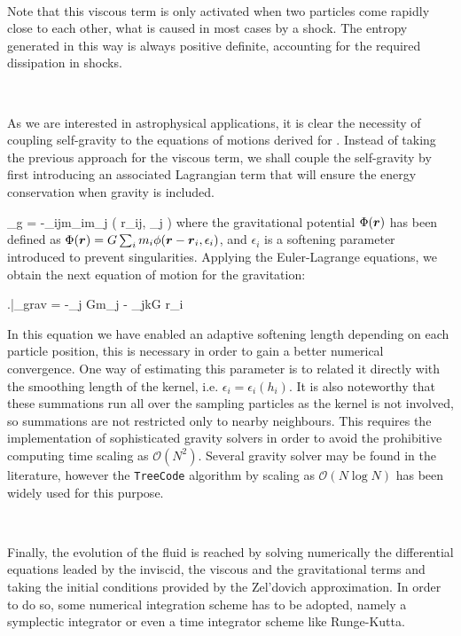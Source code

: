 \documentclass[a4,useAMS,usenatbib,usegraphicx,12pt]{article}
\begin{document}
\

Note that this viscous term is only activated when two particles come rapidly 
close to each other, what is caused in most cases by a shock. The entropy 
generated in this way is always positive definite, accounting for the required
dissipation in shocks.

\

As we are interested in astrophysical applications, it is clear the necessity 
of coupling self-gravity to the equations of motions derived for \SPH. Instead 
of taking the previous approach for the viscous term, we shall couple the
self-gravity by first introducing an associated Lagrangian term that will
ensure the energy conservation when gravity is included.

{ _g = -\sum_{i\neq j}m_im_j \phi( r_{ij}, \epsilon_j ) }
where the gravitational potential $\Phi(\boldsymbol{ r })$ has been defined as 
$\Phi(\boldsymbol{ r }) = G \sum_i m_i \phi(\boldsymbol{ r } - \boldsymbol{ r }_i, \epsilon_i)$, and $\epsilon_i$
is a softening parameter introduced to prevent singularities. Applying the 
Euler-Lagrange equations, we obtain the next equation of motion for the 
gravitation:


{ \left.\right|_{\mbox{\footnotesize{grav}}} = 
-\sum_j Gm_j  - \sum_{j\neq k}G
{\partial \bds r_i} }


In this equation we have enabled an adaptive softening length depending on each 
particle position, this is necessary in order to gain a better numerical 
convergence. One way of estimating this parameter is to related it directly with
the smoothing length of the kernel, i.e. $\epsilon_i = \epsilon_i(h_i)$. It is 
also noteworthy that these summations run all over the sampling particles as the 
kernel is not involved, so summations are not restricted only to nearby neighbours. 
This requires the implementation of sophisticated gravity solvers in order to 
avoid the prohibitive computing time scaling as $\mathcal{O}(N^2)$. Several 
gravity solver may be found in the literature, however the \texttt{TreeCode} 
algorithm by \citet{barnes1986} scaling as $\mathcal{O}(N\log N)$ has been widely 
used for this purpose.

\

Finally, the evolution of the fluid is reached by solving numerically the 
differential equations leaded by the inviscid, the viscous and the gravitational 
terms and taking the initial conditions provided by the Zel'dovich approximation. 
In order to do so, some numerical integration scheme has to be adopted, namely a 
symplectic integrator or even a time integrator scheme like Runge-Kutta.
\end{document}
